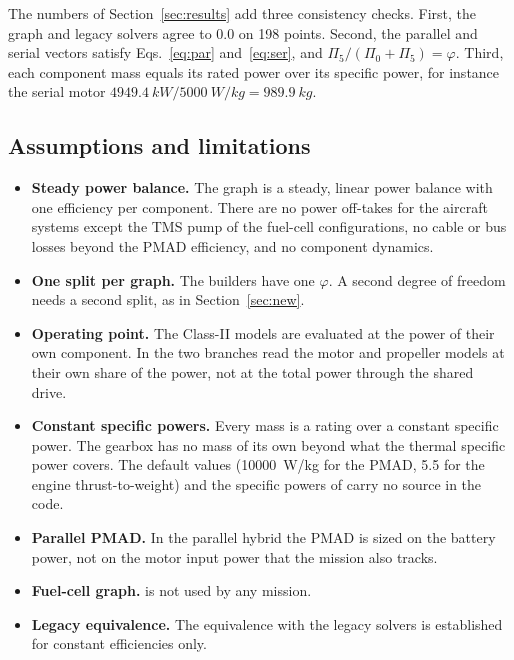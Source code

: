 \documentclass[a4paper,11pt]{article}
\begin{document}
The numbers of Section~\ref{sec:results} add three consistency checks. First, the graph and
legacy solvers agree to 0.0 on 198 points. Second, the parallel and serial vectors satisfy
Eqs.~\eqref{eq:par} and~\eqref{eq:ser}, and $\Pi_5/(\Pi_0 + \Pi_5) = \varphi$. Third, each
component mass equals its rated power over its specific power, for instance the serial motor
$\SI{4949.4}{kW}/\SI{5000}{W/kg} = \SI{989.9}{kg}$.

\subsection{Assumptions and limitations}
\begin{itemize}
\item \textbf{Steady power balance.} The graph is a steady, linear power balance with one
  efficiency per component. There are no power off-takes for the aircraft systems except the
  TMS pump of the fuel-cell configurations, no cable or bus losses beyond the PMAD
  efficiency, and no component dynamics.
\item \textbf{One split per graph.} The builders have one $\varphi$. A second degree of
  freedom needs a second split, as in Section~\ref{sec:new}.
\item \textbf{Operating point.} The Class-II models are evaluated at the power of their own
  component. In  the two branches read the motor and propeller models
  at their own share of the power, not at the total power through the shared drive.
\item \textbf{Constant specific powers.} Every mass is a rating over a constant specific
  power. The gearbox has no mass of its own beyond what the thermal specific power covers.
  The default values (\SI{10000}{W/kg} for the PMAD, 5.5 for the engine thrust-to-weight) and
  the specific powers of  carry no source in the code.
\item \textbf{Parallel PMAD.} In the parallel hybrid the PMAD is sized on the battery power,
  not on the motor input power  that the mission also tracks.
\item \textbf{Fuel-cell graph.}  is not used by any mission.
\item \textbf{Legacy equivalence.} The equivalence with the legacy solvers is established for
  constant efficiencies only.
\end{itemize}

\end{document}
